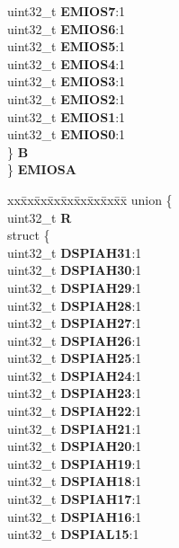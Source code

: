 \begin{DoxyCompactItemize}
\begin{tabbing}
\>\>uint32\_t {\bfseries EMIOS7}:1\\
\>\>uint32\_t {\bfseries EMIOS6}:1\\
\>\>uint32\_t {\bfseries EMIOS5}:1\\
\>\>uint32\_t {\bfseries EMIOS4}:1\\
\>\>uint32\_t {\bfseries EMIOS3}:1\\
\>\>uint32\_t {\bfseries EMIOS2}:1\\
\>\>uint32\_t {\bfseries EMIOS1}:1\\
\>\>uint32\_t {\bfseries EMIOS0}:1\\
\>\} {\bfseries B}\\
\} {\bfseries EMIOSA}\\

\end{tabbing}\item 
\mbox{\label{structSIU__tag_a05ef28d272ab400fb4ba888656b47a16}} 
\begin{tabbing}
xx\=xx\=xx\=xx\=xx\=xx\=xx\=xx\=xx\=\kill
union \{\\
\>uint32\_t {\bfseries R}\\
\>struct \{\\
\>\>uint32\_t {\bfseries DSPIAH31}:1\\
\>\>uint32\_t {\bfseries DSPIAH30}:1\\
\>\>uint32\_t {\bfseries DSPIAH29}:1\\
\>\>uint32\_t {\bfseries DSPIAH28}:1\\
\>\>uint32\_t {\bfseries DSPIAH27}:1\\
\>\>uint32\_t {\bfseries DSPIAH26}:1\\
\>\>uint32\_t {\bfseries DSPIAH25}:1\\
\>\>uint32\_t {\bfseries DSPIAH24}:1\\
\>\>uint32\_t {\bfseries DSPIAH23}:1\\
\>\>uint32\_t {\bfseries DSPIAH22}:1\\
\>\>uint32\_t {\bfseries DSPIAH21}:1\\
\>\>uint32\_t {\bfseries DSPIAH20}:1\\
\>\>uint32\_t {\bfseries DSPIAH19}:1\\
\>\>uint32\_t {\bfseries DSPIAH18}:1\\
\>\>uint32\_t {\bfseries DSPIAH17}:1\\
\>\>uint32\_t {\bfseries DSPIAH16}:1\\
\>\>uint32\_t {\bfseries DSPIAL15}:1\\

\end{tabbing}
\end{DoxyCompactItemize}
